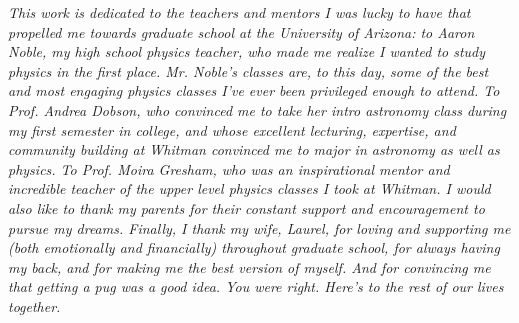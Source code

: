 \begin{center}
\emph{This work is dedicated to the teachers and mentors I was lucky to have that propelled me towards graduate school at the University of Arizona:  
	to Aaron Noble, my high school physics teacher, who made me realize I wanted to study physics in the first place.  Mr. Noble's classes are, to this day, some of the best and most engaging physics classes I've ever been privileged enough to attend.
	To Prof. Andrea Dobson, who convinced me to take her intro astronomy class during my first semester in college, and whose excellent lecturing, expertise, and community building at Whitman convinced me to major in astronomy as well as physics.
	To Prof. Moira Gresham,  who was an inspirational mentor and incredible teacher of the upper level physics classes I took at Whitman.
	I would also like to thank my parents for their constant support and encouragement to pursue my dreams.  
	Finally, I thank my wife, Laurel, for loving and supporting me (both emotionally and financially) throughout graduate school, for always having my back, and for making me the best version of myself.  And for convincing me that getting a pug was a good idea.  You were right.  Here's to the rest of our lives together.
 }
\end{center}

